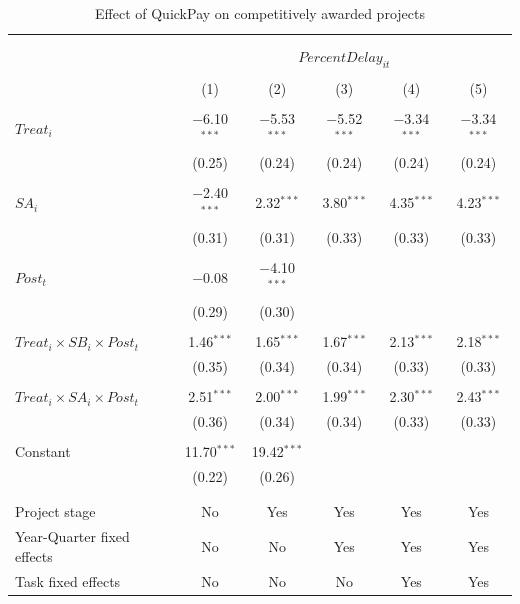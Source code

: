 \documentclass[
]{article}
\begin{document}
\begin{table}[H] \centering 
  \caption{Effect of QuickPay on competitively awarded projects} 
  \label{} 
\small 
\begin{tabular}{@{\extracolsep{-2pt}}lccccc} 
\\[-1.8ex]\hline 
\hline \\[-1.8ex] 
\\[-1.8ex] & \multicolumn{5}{c}{$PercentDelay_{it}$  } \\ 
\\[-1.8ex] & (1) & (2) & (3) & (4) & (5)\\ 
\hline \\[-1.8ex] 
 $Treat_i$ & $-$6.10$^{***}$ & $-$5.53$^{***}$ & $-$5.52$^{***}$ & $-$3.34$^{***}$ & $-$3.34$^{***}$ \\ 
  & (0.25) & (0.24) & (0.24) & (0.24) & (0.24) \\ 
  & & & & & \\ 
 $SA_i$ & $-$2.40$^{***}$ & 2.32$^{***}$ & 3.80$^{***}$ & 4.35$^{***}$ & 4.23$^{***}$ \\ 
  & (0.31) & (0.31) & (0.33) & (0.33) & (0.33) \\ 
  & & & & & \\ 
 $Post_t$ & $-$0.08 & $-$4.10$^{***}$ &  &  &  \\ 
  & (0.29) & (0.30) &  &  &  \\ 
  & & & & & \\ 
 $Treat_i \times SB_i \times Post_t$ & 1.46$^{***}$ & 1.65$^{***}$ & 1.67$^{***}$ & 2.13$^{***}$ & 2.18$^{***}$ \\ 
  & (0.35) & (0.34) & (0.34) & (0.33) & (0.33) \\ 
  & & & & & \\ 
 $Treat_i \times SA_i \times Post_t$ & 2.51$^{***}$ & 2.00$^{***}$ & 1.99$^{***}$ & 2.30$^{***}$ & 2.43$^{***}$ \\ 
  & (0.36) & (0.34) & (0.34) & (0.33) & (0.33) \\ 
  & & & & & \\ 
 Constant & 11.70$^{***}$ & 19.42$^{***}$ &  &  &  \\ 
  & (0.22) & (0.26) &  &  &  \\ 
  & & & & & \\ 
\hline \\[-1.8ex] 
Project stage & No & Yes & Yes & Yes & Yes \\ 
Year-Quarter fixed effects & No & No & Yes & Yes & Yes \\ 
Task fixed effects & No & No & No & Yes & Yes \\ 

\end{tabular}
\end{table}
\end{document}
